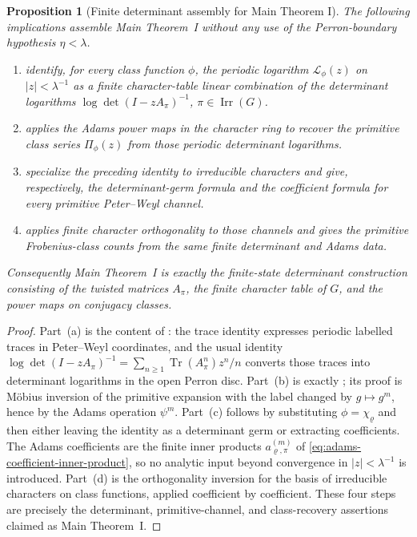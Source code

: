 \documentclass[11pt,a4paper]{amsart}
\theoremstyle{plain}
\newtheorem{proposition}[theorem]{Proposition}
\theoremstyle{definition}
\theoremstyle{remark}
\DeclareMathOperator{\Tr}{Tr}
\DeclareMathOperator{\Irr}{Irr}
\begin{document}
\begin{proposition}[Finite determinant assembly for Main Theorem I]
  \label{prop:main-theorem-i-assembly-map}
  The following implications assemble Main Theorem~I without any use of
  the Perron-boundary hypothesis \(\eta<\lambda\).
  \begin{enumerate}[label=\textup{(\alph*)},leftmargin=*]
    \item {}
    identify, for every class function \(\phi\), the periodic logarithm
    \(\mathcal L_\phi(z)\) on \(|z|<\lambda^{-1}\) as a finite
    character-table linear combination of the determinant logarithms
    \(\log\det(I-zA_\pi)^{-1}\), \(\pi\in\Irr(G)\).
    \item {} applies the Adams power
    maps in the character ring to recover the primitive class series
    \(\Pi_\phi(z)\) from those periodic determinant logarithms.
    \item {} specialize the preceding identity to
    irreducible characters and give, respectively, the determinant-germ
    formula and the coefficient formula for every primitive Peter--Weyl
    channel.
    \item {} applies finite character
    orthogonality to those channels and gives the primitive Frobenius-class
    counts from the same finite determinant and Adams data.
  \end{enumerate}
  Consequently Main Theorem~I is exactly the finite-state determinant
  construction consisting of the twisted matrices \(A_\pi\), the finite
  character table of \(G\), and the power maps on conjugacy classes.
\end{proposition}

\begin{proof}
  Part~(a) is the content of
  : the
  trace identity expresses periodic labelled traces in Peter--Weyl
  coordinates, and the usual identity
  \(\log\det(I-zA_\pi)^{-1}=\sum_{n\ge1}\Tr(A_\pi^n)z^n/n\) converts those
  traces into determinant logarithms in the open Perron disc. Part~(b) is
  exactly ; its proof is M\"obius
  inversion of the primitive expansion with the label changed by
  \(g\mapsto g^m\), hence by the Adams operation \(\psi^m\). Part~(c)
  follows by substituting \(\phi=\chi_\varrho\) and then either leaving the
  identity as a determinant germ or extracting coefficients. The Adams
  coefficients are the finite inner products
  \(a_{\varrho,\pi}^{(m)}\) of
  \eqref{eq:adams-coefficient-inner-product}, so no analytic input beyond
  convergence in \(|z|<\lambda^{-1}\) is introduced. Part~(d) is the
  orthogonality inversion for the basis of irreducible characters on class
  functions, applied coefficient by coefficient. These four steps are
  precisely the determinant, primitive-channel, and class-recovery assertions
  claimed as Main Theorem~I.
\end{proof}
\end{document}
